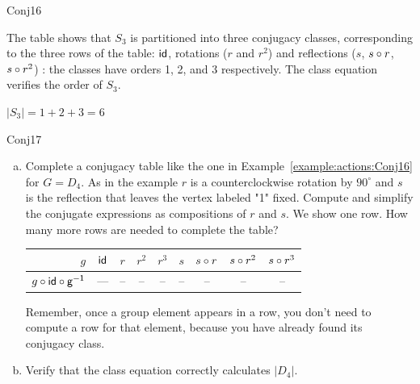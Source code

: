 \begin{example}{Conj16}

The table shows that $S_3$ is partitioned into  three conjugacy classes, corresponding to the three rows of the table: $\sf{id}$, rotations ($r$ and $r^2$) and reflections ($s$, $s \circ r$, $s \circ r^2$) : the classes have orders 1, 2, and 3 respectively.  The class equation verifies the order of $S_3$.

$|S_3|=1+2+3=6$
\end{example}

\begin{exercise}{Conj17}
\begin{enumerate}[(a)]
\item Complete a conjugacy table like the one in  Example~\ref{example:actions:Conj16} for $G=D_4$. As in the example $r$ is a counterclockwise rotation by  $90^{\circ}$ and $s$ is the reflection that leaves the vertex labeled "1" fixed. Compute and simplify the conjugate expressions as compositions of $r$ and $s$. We show one row.  How many more rows are needed to complete the table?

\begin{center}

\begin{tabular}{ |r| c | c |c |c |c |c | c|c |} \hline
  $g$ &$\sf{id}$ & $r$ &$r^2$ &$r^3$ & $s$ &$s\circ r$ & $s\circ r ^2$ & $s\circ r^3$\\ \hline
  $g\circ \sf{id}\circ g^{-1}$ &--- & -- & -- &-- &--&--&--&-- \\
\end{tabular}
\end{center}

 Remember, once a group element appears in a row, you don't need to compute a row for that element, because you have already found its conjugacy class.
\item Verify that the class equation correctly calculates $|D_4|$.
\end{enumerate}
\end{exercise}

